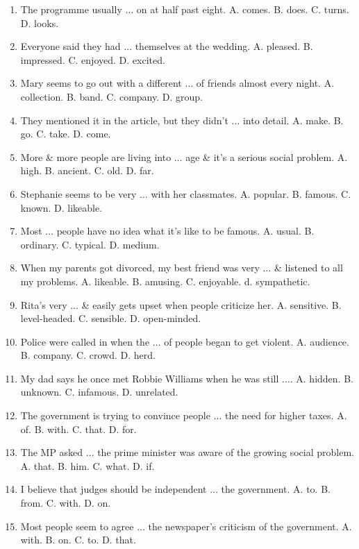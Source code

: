 \documentclass{article}
\numberwithin{equation}{section}
\begin{document}
\begin{enumerate}[leftmargin=8mm]
	\item The programme usually $\ldots$ on at half past eight. {\sf A.} comes. {\sf B.} does. {\sf C.} turns. {\sf D.} looks.
	\item Everyone said they had $\ldots$ themselves at the wedding. {\sf A.} pleased. {\sf B.} impressed. {\sf C.} enjoyed. {\sf D.} excited.
	\item Mary seems to go out with a different $\ldots$ of friends almost every night. {\sf A.} collection. {\sf B.} band. {\sf C.} company. {\sf D.} group.
	\item They mentioned it in the article, but they didn't $\ldots$ into detail. {\sf A.} make. {\sf B.} go. {\sf C.} take. {\sf D.} come.
	\item More \& more people are living into $\ldots$ age \& it's a serious social problem. {\sf A.} high. {\sf B.} ancient. {\sf C.} old. {\sf D.} far.
	\item Stephanie seems to be very $\ldots$ with her classmates. {\sf A.} popular. {\sf B.} famous. {\sf C.} known. {\sf D.} likeable.
	\item Most $\ldots$ people have no idea what it's like to be famous. {\sf A.} usual. {\sf B.} ordinary. {\sf C.} typical. {\sf D.} medium.
	\item When my parents got divorced, my best friend was very $\ldots$ \& listened to all my problems. {\sf A.} likeable. {\sf B.} amusing. {\sf C.} enjoyable. d. sympathetic.
	\item Rita's very $\ldots$ \& easily gets upset when people criticize her. {\sf A.} sensitive. {\sf B.} level-headed. {\sf C.} sensible. {\sf D.} open-minded.
	\item Police were called in when the $\ldots$ of people began to get violent. {\sf A.} audience. {\sf B.} company. {\sf C.} crowd. {\sf D.} herd.
	\item My dad says he once met Robbie Williams when he was still $\ldots$. {\sf A.} hidden. {\sf B.} unknown. {\sf C.} infamous. {\sf D.} unrelated.
	\item The government is trying to convince people $\ldots$ the need for higher taxes. {\sf A.} of. {\sf B.} with. {\sf C.} that. {\sf D.} for.
	\item The MP asked $\ldots$ the prime minister was aware of the growing social problem. {\sf A.} that. {\sf B.} him. {\sf C.} what. {\sf D.} if.
	\item I believe that judges should be independent $\ldots$ the government. {\sf A.} to. {\sf B.} from. {\sf C.} with. {\sf D.} on.
	\item Most people seem to agree $\ldots$ the newspaper's criticism of the government. {\sf A.} with. {\sf B.} on. {\sf C.} to. {\sf D.} that.

\end{enumerate}
\end{document}
